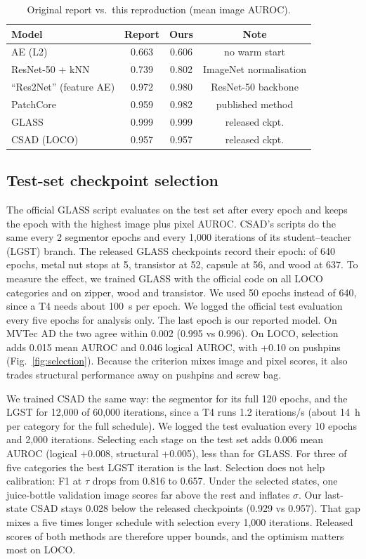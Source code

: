 \documentclass[conference]{IEEEtran}
\begin{document}
\begin{table}[t]
\caption{Original report vs.\ this reproduction (mean image AUROC).}
\label{tab:orig}
\centering\footnotesize
\begin{tabular}{@{}lccc@{}}
\toprule
Model & Report & Ours & Note \\
\midrule
AE (L2) & 0.663 & 0.606 & no warm start \\
ResNet-50 + kNN & 0.739 & 0.802 & ImageNet normalisation \\
``Res2Net'' (feature AE) & 0.972 & 0.980 & ResNet-50 backbone \\
PatchCore & 0.959 & 0.982 & published method \\
GLASS & 0.999 & 0.999 & released ckpt. \\
CSAD (LOCO) & 0.957 & 0.957 & released ckpt. \\
\bottomrule
\end{tabular}
\end{table}

\subsection{Test-set checkpoint selection}\label{sec:selection}
The official GLASS script evaluates on the test set after every epoch and keeps the epoch with the highest image
plus pixel AUROC. CSAD's scripts do the same every 2 segmentor epochs and every 1,000 iterations of its
student--teacher (LGST) branch. The released GLASS checkpoints record their
epoch: of 640 epochs, metal nut stops at 5, transistor at 52, capsule at 56, and wood at 637. To measure the effect,
we trained GLASS with the official code on all LOCO categories and on zipper, wood and transistor. We used 50
epochs instead of 640, since a T4 needs about 100~s per epoch. We logged the official test evaluation every five
epochs for analysis only. The last epoch is our reported model. On MVTec AD the two agree within 0.002
(0.995 vs 0.996). On LOCO, selection adds 0.015 mean AUROC and 0.046 logical AUROC, with +0.10 on pushpins
(Fig.~\ref{fig:selection}). Because the criterion mixes image and pixel scores, it also trades structural
performance away on pushpins and screw bag.

We trained CSAD the same way: the segmentor for its full 120 epochs, and the LGST for 12,000 of 60,000 iterations,
since a T4 runs 1.2 iterations/s (about 14~h per category for the full schedule). We logged the test evaluation every
10 epochs and 2,000 iterations. Selecting each stage on the test set adds 0.006 mean AUROC (logical +0.008,
structural +0.005), less than for GLASS. For three of five categories the best LGST iteration is the last. Selection
does not help calibration: F1 at $\tau$ drops from 0.816 to 0.657. Under the selected states, one juice-bottle
validation image scores far above the rest and inflates $\sigma$. Our last-state CSAD stays 0.028 below the released
checkpoints (0.929 vs 0.957). That gap mixes a five times longer schedule with selection every 1,000 iterations.
Released scores of both methods are therefore upper bounds, and the optimism matters most on LOCO.
\end{document}
